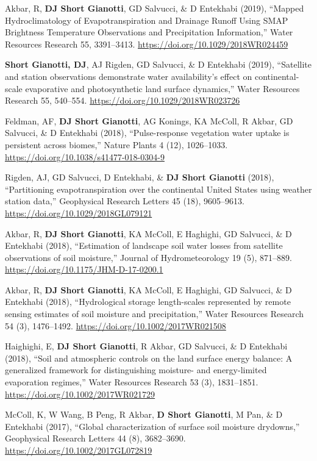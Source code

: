 \documentclass[10pt, a4paper]{article}
\newcommand{\lbr}{\vspace*{12pt}}
\newcommand{\years}[1]{\mbox{}\marginnote{\scriptsize #1}} %
\begin{document}
\years{2019b}Akbar, R, \textbf{DJ Short Gianotti}, GD Salvucci, \& D Entekhabi (2019), ``Mapped Hydroclimatology of Evapotranspiration and Drainage Runoff Using SMAP Brightness Temperature Observations and Precipitation Information,'' Water Resources Research 55, 3391--3413. \url{https://doi.org/10.1029/2018WR024459}\lbr  

\years{2019a}\textbf{Short Gianotti, DJ}, AJ Rigden, GD Salvucci, \& D Entekhabi (2019), ``Satellite and station observations demonstrate water availability's effect on continental-scale evaporative and photosynthetic land surface dynamics,'' Water Resources Research 55, 540--554. \url{https://doi.org/10.1029/2018WR023726} \lbr

\years{2018e}Feldman, AF, \textbf{DJ Short Gianotti}, AG Konings, KA McColl, R Akbar, GD Salvucci, \& D Entekhabi (2018), ``Pulse-response vegetation water uptake is persistent across biomes,'' Nature Plants 4 (12), 1026--1033. \url{https://doi.org/10.1038/s41477-018-0304-9} \lbr

\years{2018d}Rigden, AJ, GD Salvucci, D Entekhabi, \& \textbf{DJ Short Gianotti} (2018), ``Partitioning evapotranspiration over the continental United States using weather station data,'' Geophysical Research Letters 45 (18), 9605--9613. \url{https://doi.org/10.1029/2018GL079121} \lbr

\years{2018c}Akbar, R, \textbf{DJ Short Gianotti}, KA McColl, E Haghighi, GD Salvucci, \& D Entekhabi (2018), ``Estimation of landscape soil water losses from satellite observations of soil moisture,'' Journal of Hydrometeorology 19 (5), 871--889. \url{https://doi.org/10.1175/JHM-D-17-0200.1} \lbr

\years{2018b}Akbar, R, \textbf{DJ Short Gianotti}, KA McColl, E Haghighi, GD Salvucci, \& D Entekhabi (2018), ``Hydrological storage length-scales represented by remote sensing estimates of soil moisture and precipitation,'' Water Resources Research 54 (3), 1476--1492. \url{ https://doi.org/10.1002/2017WR021508}\lbr

\years{2018a}Haighighi, E, \textbf{DJ Short Gianotti}, R Akbar, GD Salvucci, \& D Entekhabi (2018), ``Soil and atmospheric controls on the land surface energy balance: A generalized framework for distinguishing moisture- and energy-limited evaporation regimes,'' Water Resources Research 53 (3), 1831--1851. \url{https://doi.org/10.1002/2017WR021729} \lbr

\years{2017b}McColl, K, W Wang, B Peng, R Akbar, \textbf{D Short Gianotti}, M Pan, \& D Entekhabi (2017), ``Global characterization of surface soil moisture drydowns,'' Geophysical Research Letters 44 (8), 3682--3690. \url{https://doi.org/10.1002/2017GL072819} \lbr
\end{document}
